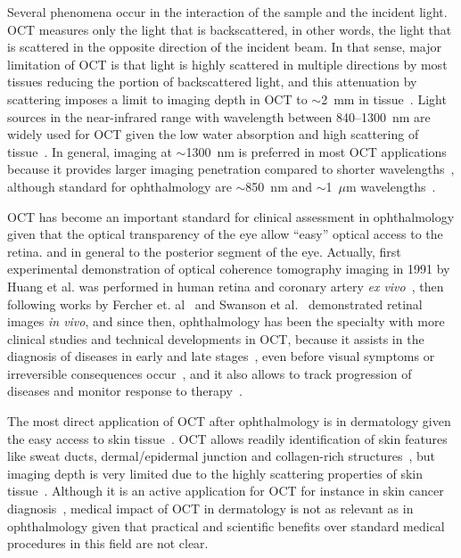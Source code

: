 Several phenomena occur in the interaction of the sample and the incident light. OCT measures only the light that is backscattered, in other words, the light that is scattered in the opposite direction of the incident beam. In that sense, major limitation of OCT is that light is highly scattered in multiple directions by most tissues reducing the portion of backscattered light, and this attenuation by scattering imposes a limit to imaging depth in OCT to $\sim$2~mm in tissue~\cite{Fujimoto2015_Introduction}. Light sources in the near-infrared range with wavelength between 840--1300~nm are widely used for OCT given the low water absorption and high scattering of tissue~\cite{Schmitt1994_Opticalcoherence}. In general, imaging at $\sim$1300~nm is preferred in most OCT applications because it provides larger imaging penetration compared to shorter wavelengths~\cite{}, although standard for ophthalmology are $\sim$850~nm and $\sim$1~$\mu$m wavelengths~\cite{Fujimoto2015_Introduction}.

OCT has become an important standard for clinical assessment in ophthalmology given that the optical transparency of the eye allow ``easy'' optical access to the retina. and in general to the posterior segment of the eye. Actually, first experimental demonstration of optical coherence tomography imaging in 1991 by Huang et al. was performed in human retina and coronary artery \textit{ex vivo}~\cite{Huang1991_Optical}, then following works by Fercher et. al~\cite{Fercher1993_Vivo} and Swanson et al.~\cite{Swanson1993_Vivo-1} demonstrated retinal images \textit{in vivo}, and since then, ophthalmology has been the specialty with more clinical studies and technical developments in OCT, because it assists in the diagnosis of diseases in early and late stages~\cite{Puliafito1995_Imaging, Chu2007_Clinical, Sathyan2012_Optical}, even before visual symptoms or irreversible consequences occur~\cite{Schuman1995_Quantification}, and it also allows to track progression of diseases and monitor response to therapy~\cite{Carrasco-Zevallos2017_Review, Chang2018_Intelligent, Maltais-Tariant2020_Realtime}.

The most direct application of OCT after ophthalmology is in dermatology given the easy access to skin tissue~\cite{Welzel2001_Optical}. OCT allows readily identification of skin features like sweat ducts, dermal/epidermal junction and collagen-rich structures~\cite{Welzel1997_Optical}, but imaging depth is very limited due to the highly scattering properties of skin tissue~\cite{Carrion2007_Comparative}. Although it is an active application for OCT for instance in skin cancer diagnosis~\cite{FerrantediRuffano2018_Optical}, medical impact of OCT in dermatology is not as relevant as in ophthalmology given that practical and scientific benefits over standard medical procedures in this field are not clear.

